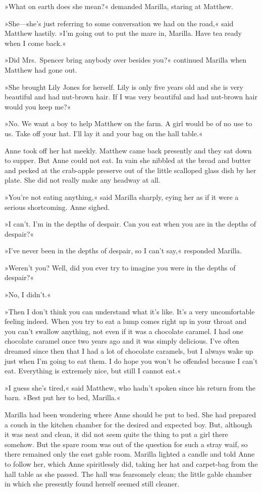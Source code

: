 »What on earth does she mean?« demanded Marilla, staring at Matthew.

»She—she's just referring to some conversation we had on the road,« said Matthew hastily. »I'm going out to put the mare in, Marilla. Have tea ready when I come back.«

»Did Mrs.~Spencer bring anybody over besides you?« continued Marilla when Matthew had gone out.

»She brought Lily Jones for herself. Lily is only five years old and she is very beautiful and had nut-brown hair. If I was very beautiful and had nut-brown hair would you keep me?«

»No. We want a boy to help Matthew on the farm. A girl would be of no use to us. Take off your hat. I'll lay it and your bag on the hall table.«

Anne took off her hat meekly. Matthew came back presently and they sat down to supper. But Anne could not eat. In vain she nibbled at the bread and butter and pecked at the crab-apple preserve out of the little scalloped glass dish by her plate. She did not really make any headway at all.

»You're not eating anything,« said Marilla sharply, eying her as if it were a serious shortcoming. Anne sighed.

»I can't. I'm in the depths of despair. Can you eat when you are in the depths of despair?«

»I've never been in the depths of despair, so I can't say,« responded Marilla.

»Weren't you? Well, did you ever try to imagine you were in the depths of despair?«

»No, I didn't.«

»Then I don't think you can understand what it's like. It's a very uncomfortable feeling indeed. When you try to eat a lump comes right up in your throat and you can't swallow anything, not even if it was a chocolate caramel. I had one chocolate caramel once two years ago and it was simply delicious. I've often dreamed since then that I had a lot of chocolate caramels, but I always wake up just when I'm going to eat them. I do hope you won't be offended because I can't eat. Everything is extremely nice, but still I cannot eat.«

»I guess she's tired,« said Matthew, who hadn't spoken since his return from the barn. »Best put her to bed, Marilla.«

Marilla had been wondering where Anne should be put to bed. She had prepared a couch in the kitchen chamber for the desired and expected boy. But, although it was neat and clean, it did not seem quite the thing to put a girl there somehow. But the spare room was out of the question for such a stray waif, so there remained only the east gable room. Marilla lighted a candle and told Anne to follow her, which Anne spiritlessly did, taking her hat and carpet-bag from the hall table as she passed. The hall was fearsomely clean; the little gable chamber in which she presently found herself seemed still cleaner.

